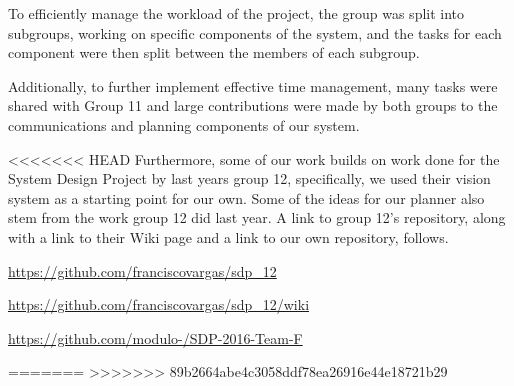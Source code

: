 \documentclass[12pt,a4paper,titlepage]{article}
\begin{document}
To efficiently manage the workload of the project, the group was split into subgroups, working on specific components of the system, and the tasks for each component were then split between the members of each subgroup. 

Additionally, to further implement effective time management, many tasks were shared with Group 11 and large contributions were made by both groups to the communications and planning components of our system.

<<<<<<< HEAD
Furthermore, some of our work builds on work done for the System Design Project by last years group 12, specifically, we used their vision system as a starting point for our own. Some of the ideas for our planner also stem from the work group 12 did last year.
A link to group 12's repository, along with a link to their Wiki page and a link to our own repository, follows.

\url{https://github.com/franciscovargas/sdp_12}

\url{https://github.com/franciscovargas/sdp_12/wiki}

\url{https://github.com/modulo-/SDP-2016-Team-F}

=======
>>>>>>> 89b2664abe4c3058ddf78ea26916e44e18721b29
%
%
%
%
%
\end{document}
